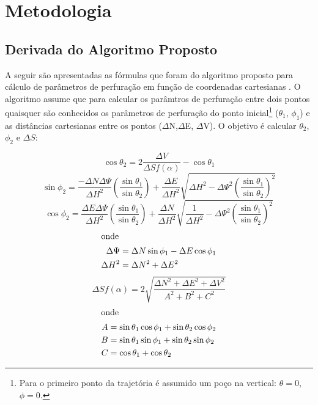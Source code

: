 \documentclass[final,3p,12pt]{elsarticle}
\begin{document}
\section{Metodologia}

\subsection{Derivada do Algoritmo Proposto}

A seguir são apresentadas as fórmulas que foram do algoritmo proposto para cálculo de parâmetros de perfuração em função de coordenadas cartesianas \cite{relatoriobisseccao}. O algoritmo assume que para calcular os parâmtros de perfuração entre dois pontos quaisquer são conhecidos os parâmetros de perfuração do ponto inicial\footnote{Para o primeiro ponto da trajetória é assumido um poço na vertical: $\theta=0$, $\phi=0$.} ($\theta_1$, $\phi_1$) e as distâncias cartesianas entre os pontos ($\Delta$N,$\Delta$E, $\Delta$V). O objetivo é calcular $\theta_2$, $\phi_2$ e $\Delta S$:

\begin{equation} \label{eq:costheta2}
    \cos \theta_2 = 2 \frac{\Delta V}{\Delta S f(\alpha)} - \cos \theta_1
\end{equation}
\begin{equation} \label{eq:sinphi2}
    \sin \phi_2 = \frac{-\Delta N \Delta \Psi}{\Delta H^2} \left( \frac{\sin \theta_1}{\sin \theta_2} \right) + \frac{\Delta E}{\Delta H^2} \sqrt{\Delta H^2 - \Delta \Psi^2 \left( \frac{\sin \theta_1}{\sin \theta_2} \right)^2} 
\end{equation}
\begin{equation} \label{eq:cosphi2}
    \cos \phi_2 = \frac{\Delta E \Delta \Psi}{\Delta H^2} \left( \frac{\sin \theta_1}{\sin \theta_2} \right) + \frac{\Delta N}{\Delta H^2} \sqrt{\frac{1}{\Delta H^2} - \Delta \Psi^2 \left( \frac{\sin \theta_1}{\sin \theta_2} \right)^2} 
\end{equation}
\begin{align*}
    \intertext{onde}
    \Delta \Psi &= \Delta N \sin \phi_1 - \Delta E \cos \phi_1 \\
    \Delta H^2 &= \Delta N^2 + \Delta E^2
\end{align*}
\begin{equation} \label{eq:DeltaSfa}
    \Delta S f(\alpha) = 2 \sqrt{\frac{\Delta N^2 + \Delta E^2 + \Delta V^2}{A^2+B^2+C^2}}
\end{equation}
\begin{align*}
    \intertext{onde}
    A &= \sin \theta_1 \cos \phi_1 + \sin \theta_2 \cos \phi_2 \\
    B &= \sin \theta_1 \sin \phi_1 + \sin \theta_2 \sin \phi_2 \\
    C &= \cos \theta_1 + \cos \theta_2
\end{align*}
\end{document}
